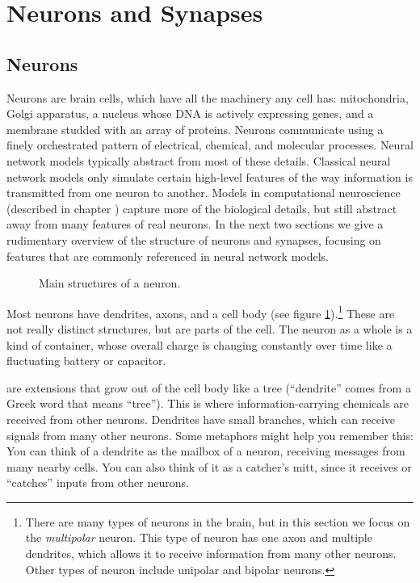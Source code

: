 \section{Neurons and Synapses}\label{neuronsSynapses}

\subsection{Neurons}

Neurons are brain cells, which have all the machinery any cell has: mitochondria, Golgi apparatus, a nucleus whose DNA is actively expressing genes, and a membrane studded with an array of proteins. Neurons communicate using a finely orchestrated pattern of electrical, chemical, and molecular processes. Neural network models typically abstract from most of these details. Classical neural network models only simulate certain high-level features of the way information is transmitted from one neuron to another. Models in computational neuroscience (described in chapter ) capture more of the biological details, but still abstract away from many features of real neurons. In the next two sections we give a rudimentary overview of the structure of neurons and synapses, focusing on features that are commonly referenced in neural network models.

\begin{figure}[h]
\centering
{}
\caption[Pamela Payne.]{Main structures of a neuron.}
\label{f:neuron}
\end{figure}

Most neurons have dendrites, axons, and a cell body (see figure \ref{f:neuron}).\footnote{There are many types of neurons in the brain, but in this section we focus on the \emph{multipolar} neuron. This type of neuron has one axon and multiple dendrites, which allows it to receive information from many other neurons. Other types of neuron include unipolar and bipolar neurons.}  These are not really distinct structures, but are parts of the cell. The neuron as a whole is a kind of container, whose overall charge is changing constantly over time like a fluctuating battery or capacitor. 

 are extensions that grow out of the cell body like a tree (``dendrite'' comes from a Greek word that means ``tree''). This is where information-carrying chemicals are received from other neurons. Dendrites have small branches, which can receive signals from many other neurons. Some metaphors might help you remember this: You can think of a dendrite as the mailbox of a neuron, receiving messages from many nearby cells. You can also think of it as a catcher's mitt, since it receives or ``catches'' inputs from other neurons.

